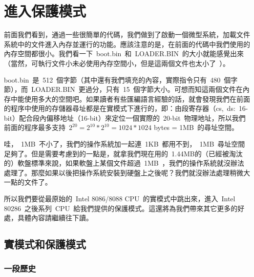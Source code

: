 \chapter{進入保護模式} \label{CHpm}

前面我們看到，通過一些很簡單的代碼，我們做到了啟動一個微型系統，加載文件系統中的文件進入內存並運行的功能。應該注意的是，在前面的代碼中我們使用的內存空間都很小。我們看一下~boot.bin~和~LOADER.BIN~的大小就能感覺出來（當然，可執行文件小未必使用內存空間小，但是這兩個文件也太小了~\smiley）。


boot.bin~是~512~個字節（其中還有我們填充的內容，實際指令只有~480~個字節），而~LOADER.BIN~更過分，只有~15~個字節大小。可想而知這兩個文件在內存中能使用多大的空間吧。如果讀者有些匯編語言經驗的話，就會發現我們在前面的程序中使用的存儲器尋址都是在實模式下進行的，即：由段寄存器（cs,~ds:~16-bit）配合段內偏移地址（16-bit）來定位一個實際的~20-bit~物理地址，所以我們前面的程序最多支持~$2^{20} = 2^{10}*2^{10} = 1024*1024$ bytes = 1MB~的尋址空間。

哇，~1MB~不小了，我們的操作系統加一起連~1KB~都用不到，~1MB~尋址空間足夠了。但是需要考慮到的一點是，就拿我們現在用的~1.44MB的（已經被淘汰的）軟盤標準來說，如果軟盤上某個文件超過~1MB~，我們的操作系統就沒辦法處理了。那麼如果以後把操作系統安裝到硬盤上之後呢？我們就沒辦法處理稍微大一點的文件了。

所以我們要從最原始的~Intel 8086/8088 CPU~的實模式中跳出來，進入~Intel 80286~之後系列~CPU~給我們提供的保護模式。這還將為我們帶來其它更多的好處，具體內容請繼續往下讀。

\section{實模式和保護模式}


\subsection{一段歷史}

